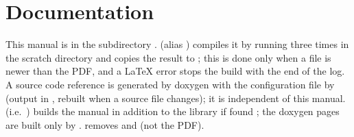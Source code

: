 \section{Documentation}

This manual is in the subdirectory .  (alias ) compiles it by running
 three times in the scratch directory  and copies the result to ; this
is done only when a  file is newer than the PDF, and a \LaTeX{} error stops the build with the end of the log.
A source code reference is generated by doxygen with the configuration file  by 
(output in , rebuilt when a source file changes); it is independent of this manual.
 (i.e.\ ) builds the manual in addition to the library if  found
; the doxygen pages are built only by .  removes  and  (not the PDF).
